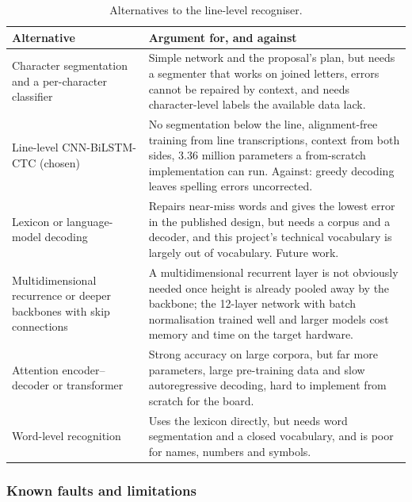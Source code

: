 \begin{table}[h]
\centering
\fontsize{8.5}{10.2}\selectfont
\setlength{\tabcolsep}{4pt}
\begin{tabularx}{\linewidth}{|p{3.1cm}|X|}
\hline
\textbf{Alternative} & \textbf{Argument for, and against} \\
\hline
Character segmentation and a per-character classifier & Simple network and the proposal's plan, but needs a segmenter that works on joined letters, errors cannot be repaired by context, and needs character-level labels the available data lack. \\
\hline
Line-level CNN-BiLSTM-CTC (chosen)~\cite[p.~2298]{shi2017} & No segmentation below the line, alignment-free training from line transcriptions, context from both sides, 3.36 million parameters a from-scratch implementation can run. Against: greedy decoding leaves spelling errors uncorrected. \\
\hline
Lexicon or language-model decoding & Repairs near-miss words and gives the lowest error in the published design, but needs a corpus and a decoder, and this project's technical vocabulary is largely out of vocabulary. Future work. \\
\hline
Multidimensional recurrence or deeper backbones with skip connections & A multidimensional recurrent layer is not obviously needed once height is already pooled away by the backbone; the 12-layer network with batch normalisation trained well and larger models cost memory and time on the target hardware. \\
\hline
Attention encoder--decoder or transformer & Strong accuracy on large corpora, but far more parameters, large pre-training data and slow autoregressive decoding, hard to implement from scratch for the board. \\
\hline
Word-level recognition & Uses the lexicon directly, but needs word segmentation and a closed vocabulary, and is poor for names, numbers and symbols. \\
\hline
\end{tabularx}
\caption{Alternatives to the line-level recogniser.}
\label{tab:rec-alt}
\end{table}

\subsubsection{Known faults and limitations}
\label{sec:wid-limits}

